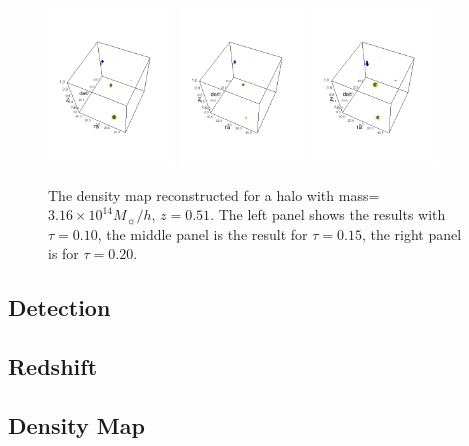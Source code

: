 \documentclass[twocolumn]{aastex62}
\begin{document}
\begin{figure}
\centering
\includegraphics[width=0.3\textwidth]{resultExp-tau010.png}
\includegraphics[width=0.3\textwidth]{resultExp-tau015.png}
\includegraphics[width=0.3\textwidth]{resultExp-tau020.png}
\caption{The density map reconstructed for a halo with mass=$3.16\times 10^14 M_{\sun}/h$, $z=0.51$. The left panel shows
the results with $\tau=0.10$, the middle panel is the result for $\tau=0.15$, the right panel is for $\tau=0.20$.}
\end{figure}


\subsection{Detection}

\subsection{Redshift}

\subsection{Density Map}
\end{document}
